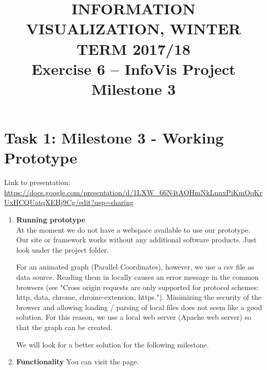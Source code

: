 \documentclass[11pt, twoside, BCOR=8mm, DIV=12]{scrartcl}
\title{{\Large INFORMATION VISUALIZATION, WINTER TERM 2017/18} \\ Exercise 6 – InfoVis Project Milestone 3}
\begin{document}
\maketitle
\section*{Task 1: Milestone 3 - Working Prototype}
Link to presentation: \\ \url{https://docs.google.com/presentation/d/1LXW_66N4tAOHmNkLnnxPiKmOqKrUxHCQUatqXEHj9Cg/edit?usp=sharing}
\begin{enumerate}[label=\alph*)]
\item \textbf{Running prototype} \\
At the moment we do not have a webspace available to use our prototype. Our site or framework works without any additional software products.
Just look under the project folder.

For an animated graph (Parallel Coordinates), however, we use a csv file as data source. Reading them in locally causes an error message in the common browsers (see "Cross origin requests are only supported for protocol schemes: http, data, chrome, chrome-extension, https.").
Minimizing the security of the browser and allowing loading / parsing of local files does not seem like a good solution. 
For this reason, we use a local web server (Apache web server) so that the graph can be created.

We will look for a better solution for the following milestone.

\item \textbf{Functionality}
You can visit the page.


\end{enumerate}
\end{document}
